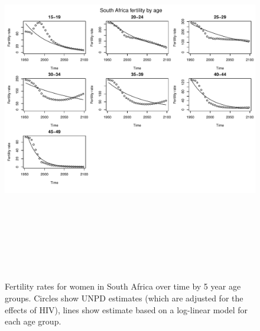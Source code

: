 \documentclass{article}
\begin{document}
\begin{figure}
\includegraphics[width=16cm,height=16cm]{EstimatingRatesFromUNPD-FertilitySA} 

\caption{Fertility rates for women in South Africa over time by 5 year age groups. Circles show UNPD estimates (which are adjusted for the effects of HIV), lines show estimate based on a log-linear model for each age group.}
\label{FertilitySA}
\end{figure}
\end{document}
